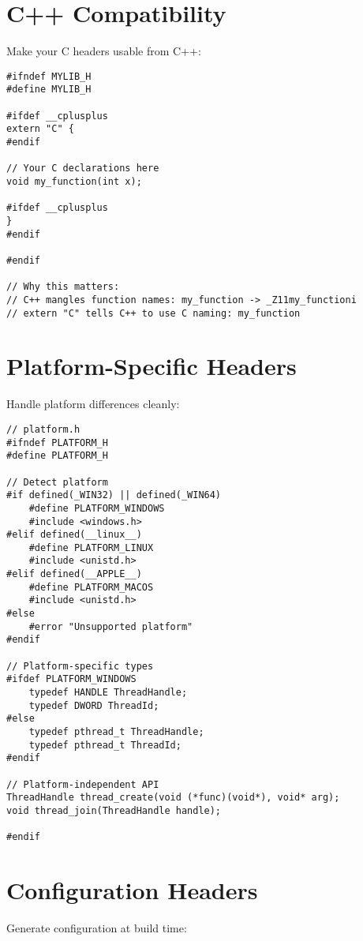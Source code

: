\section{C++ Compatibility}

Make your C headers usable from C++:

\begin{lstlisting}
#ifndef MYLIB_H
#define MYLIB_H

#ifdef __cplusplus
extern "C" {
#endif

// Your C declarations here
void my_function(int x);

#ifdef __cplusplus
}
#endif

#endif

// Why this matters:
// C++ mangles function names: my_function -> _Z11my_functioni
// extern "C" tells C++ to use C naming: my_function
\end{lstlisting}

\section{Platform-Specific Headers}

Handle platform differences cleanly:

\begin{lstlisting}
// platform.h
#ifndef PLATFORM_H
#define PLATFORM_H

// Detect platform
#if defined(_WIN32) || defined(_WIN64)
    #define PLATFORM_WINDOWS
    #include <windows.h>
#elif defined(__linux__)
    #define PLATFORM_LINUX
    #include <unistd.h>
#elif defined(__APPLE__)
    #define PLATFORM_MACOS
    #include <unistd.h>
#else
    #error "Unsupported platform"
#endif

// Platform-specific types
#ifdef PLATFORM_WINDOWS
    typedef HANDLE ThreadHandle;
    typedef DWORD ThreadId;
#else
    typedef pthread_t ThreadHandle;
    typedef pthread_t ThreadId;
#endif

// Platform-independent API
ThreadHandle thread_create(void (*func)(void*), void* arg);
void thread_join(ThreadHandle handle);

#endif
\end{lstlisting}

\section{Configuration Headers}

Generate configuration at build time:

